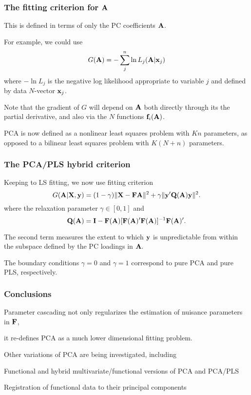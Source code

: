 \documentclass[11pt]{beamer}
\begin{document}

\begin{frame}

\frametitle{The fitting criterion for $\mbox{\bf A}$}

\bi
  \item This is defined in terms of only the PC coefficients $\mbox{\bf A}$.
  \item For example, we could use
  \[
    G(\mbox{\bf A}) = -\sum_j^n \ln L_j(\mbox{\bf A}|\mbox{\bf x}_j)
  \]
  where $-\ln L_j$ is the negative log likelihood appropriate to variable $j$ and
  defined by data $N$-vector $\mbox{\bf x}_j$.
  \item Note that the gradient of $G$ will depend on $\mbox{\bf A}$ both directly through its the partial derivative, and also via the $N$ functions $\mbox{\bf f}_i(\mbox{\bf A})$.
  \item PCA is now defined as a nonlinear least squares problem with $Kn$ parameters, as opposed to a
  bilinear least squares problem with $K(N+n)$ parameters.
\ei

\end{frame}


\begin{frame}

\frametitle{The PCA/PLS hybrid criterion}

\bi
  \item Keeping to LS fitting, we now use fitting criterion
  \[
    G(\mbox{\bf A}| \mbox{\bf X}, \mbox{\bf y}) = (1-\gamma) \| \mbox{\bf X} - \mbox{\bf F} \mbox{\bf A} \|^2 +
                                    \gamma \| \mbox{\bf y}' \mbox{\bf Q}(\mbox{\bf A}) \mbox{\bf y} \|^2.
  \]
  where the relaxation parameter $\gamma \in [0,1]$ and
  \[
    \mbox{\bf Q}(\mbox{\bf A}) = \mbox{\bf I} - \mbox{\bf F}(\mbox{\bf A}) [\mbox{\bf F}(\mbox{\bf A})' \mbox{\bf F}(\mbox{\bf A})]^{-1} \mbox{\bf F}(\mbox{\bf A})'.
  \]
  \item The second term measures the extent to which $\mbox{\bf y}$ is unpredictable from within the subspace defined by the PC loadings in $\mbox{\bf A}.$
  \item The boundary conditions $\gamma = 0$ and $\gamma = 1$ correspond to pure PCA and pure PLS, respectively.
\ei

\end{frame}


\begin{frame}

\frametitle{Conclusions}

\bi
  \item Parameter cascading not only regularizes the estimation of nuisance parameters in $\mbox{\bf F}$,
  \item it re-defines PCA as a much lower dimensional fitting problem.
  \item Other variations of PCA are  being investigated, including
  \bi
    \item Functional and hybrid multivariate/functional versions of PCA and PCA/PLS
    \item Registration of functional data to their principal components
  \ei
\ei

\end{frame}
\end{document}
